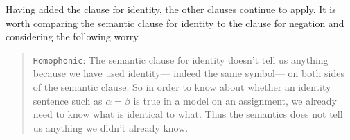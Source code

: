 

Having added the clause for identity, the other clauses continue to apply.
It is worth comparing the semantic clause for identity to the clause for negation and considering the following worry.

\begin{quote}
  \texttt{Homophonic}:
  The semantic clause for identity doesn't tell us anything because we have used identity--- indeed the same symbol--- on both sides of the semantic clause.
  So in order to know about whether an identity sentence such as $\alpha=\beta$ is true in a model on an assignment, we already need to know what is identical to what.
  Thus the semantics does not tell us anything we didn't already know.
\end{quote}

